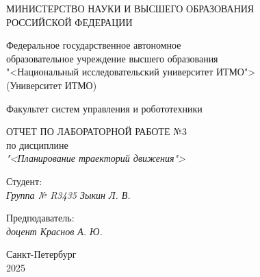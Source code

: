 \thispagestyle{empty}

\begin{center}
    МИНИСТЕРСТВО НАУКИ И ВЫСШЕГО ОБРАЗОВАНИЯ \\ РОССИЙСКОЙ ФЕДЕРАЦИИ

    \vspace{20pt}

    Федеральное государственное автономное \\ образовательное учреждение высшего образования \\
    "<Национальный исследовательский университет ИТМО"> \\
    (Университет ИТМО)

    \vspace{20pt}

    Факультет систем управления и робототехники
\end{center}

\vfill

\begin{center}
    ОТЧЕТ ПО ЛАБОРАТОРНОЙ РАБОТЕ №3\\  
    по дисциплине \\
    \textit{"<Планирование траекторий движения">}

    \vspace{20pt}

    
\end{center}

\vfill

    \noindent Студент: \\
    \textit{Группа № R3435 \hfill Зыкин Л. В.}

    \vspace{20pt}

    \noindent Предподаватель: \\
    \textit{доцент \hfill Краснов А. Ю.}

\vfill

\begin{center}
    Санкт-Петербург \\ 2025
\end{center}
